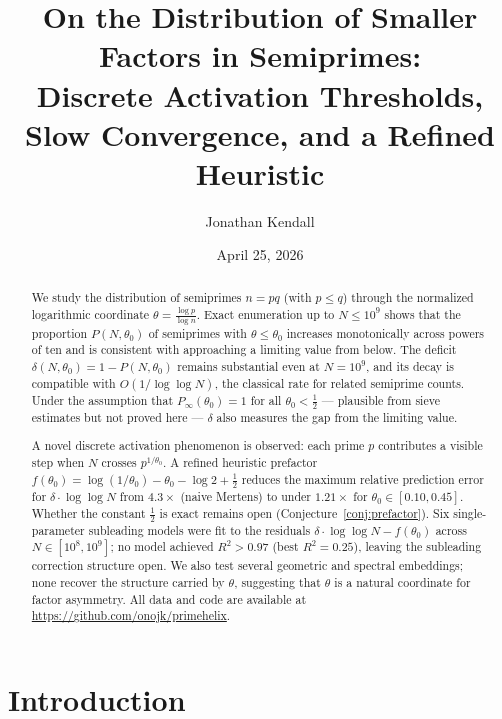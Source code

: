 \documentclass[11pt]{article}
\title{
  \textbf{On the Distribution of Smaller Factors in Semiprimes:}\\[4pt]
  \large Discrete Activation Thresholds, Slow Convergence, and a Refined Heuristic
}
\author{Jonathan Kendall}
\date{April 25, 2026}
\theoremstyle{definition}
\begin{document}
\maketitle

\begin{abstract}
We study the distribution of semiprimes \(n = pq\) (with \(p \leq q\)) through the
normalized logarithmic coordinate \(\theta = \frac{\log p}{\log n}\).
Exact enumeration up to \(N \leq 10^9\) shows that the proportion \(P(N,\theta_0)\)
of semiprimes with \(\theta \leq \theta_0\) increases monotonically across powers of ten
and is consistent with approaching a limiting value from below.
The deficit \(\delta(N,\theta_0) = 1 - P(N,\theta_0)\) remains substantial even at
\(N = 10^9\), and its decay is compatible with \(O(1/\!\log\log N)\), the classical rate
for related semiprime counts.
Under the assumption that \(P_\infty(\theta_0) = 1\) for all \(\theta_0 < \tfrac{1}{2}\)
--- plausible from sieve estimates but not proved here --- \(\delta\) also measures
the gap from the limiting value.

A novel discrete activation phenomenon is observed: each prime \(p\) contributes a
visible step when \(N\) crosses \(p^{1/\theta_0}\).
A refined heuristic prefactor
\(f(\theta_0) = \log(1/\theta_0) - \theta_0 - \log 2 + \tfrac{1}{2}\) reduces the
maximum relative prediction error for \(\delta\cdot\log\log N\) from \(4.3\times\)
(naive Mertens) to under \(1.21\times\) for \(\theta_0\in[0.10,0.45]\).
Whether the constant \(\tfrac{1}{2}\) is exact remains open (Conjecture~\ref{conj:prefactor}).
Six single-parameter subleading models were fit to the residuals
\(\delta\cdot\log\log N - f(\theta_0)\) across \(N \in [10^8, 10^9]\);
no model achieved \(R^2 > 0.97\) (best \(R^2 = 0.25\)), leaving the subleading
correction structure open.
We also test several geometric and spectral embeddings; none recover the structure
carried by \(\theta\), suggesting that \(\theta\) is a natural coordinate for
factor asymmetry.
All data and code are available at
\url{https://github.com/onojk/primehelix}.
\end{abstract}


\section{Introduction}
\end{document}
